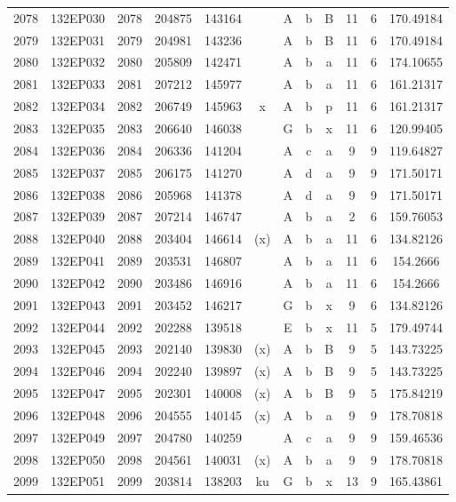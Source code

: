 \begin{tabular}{|*{12}{c|}}
2078 & 132EP030 & 2078 & 204875 & 143164 &  & A & b & B & 11 & 6 & 170.49184 \\ 
2079 & 132EP031 & 2079 & 204981 & 143236 &  & A & b & B & 11 & 6 & 170.49184 \\ 
2080 & 132EP032 & 2080 & 205809 & 142471 &  & A & b & a & 11 & 6 & 174.10655 \\ 
2081 & 132EP033 & 2081 & 207212 & 145977 &  & A & b & a & 11 & 6 & 161.21317 \\ 
2082 & 132EP034 & 2082 & 206749 & 145963 & x & A & b & p & 11 & 6 & 161.21317 \\ 
2083 & 132EP035 & 2083 & 206640 & 146038 &  & G & b & x & 11 & 6 & 120.99405 \\ 
2084 & 132EP036 & 2084 & 206336 & 141204 &  & A & c & a & 9 & 9 & 119.64827 \\ 
2085 & 132EP037 & 2085 & 206175 & 141270 &  & A & d & a & 9 & 9 & 171.50171 \\ 
2086 & 132EP038 & 2086 & 205968 & 141378 &  & A & d & a & 9 & 9 & 171.50171 \\ 
2087 & 132EP039 & 2087 & 207214 & 146747 &  & A & b & a & 2 & 6 & 159.76053 \\ 
2088 & 132EP040 & 2088 & 203404 & 146614 & (x) & A & b & a & 11 & 6 & 134.82126 \\ 
2089 & 132EP041 & 2089 & 203531 & 146807 &  & A & b & a & 11 & 6 & 154.2666 \\ 
2090 & 132EP042 & 2090 & 203486 & 146916 &  & A & b & a & 11 & 6 & 154.2666 \\ 
2091 & 132EP043 & 2091 & 203452 & 146217 &  & G & b & x & 9 & 6 & 134.82126 \\ 
2092 & 132EP044 & 2092 & 202288 & 139518 &  & E & b & x & 11 & 5 & 179.49744 \\ 
2093 & 132EP045 & 2093 & 202140 & 139830 & (x) & A & b & B & 9 & 5 & 143.73225 \\ 
2094 & 132EP046 & 2094 & 202240 & 139897 & (x) & A & b & B & 9 & 5 & 143.73225 \\ 
2095 & 132EP047 & 2095 & 202301 & 140008 & (x) & A & b & B & 9 & 5 & 175.84219 \\ 
2096 & 132EP048 & 2096 & 204555 & 140145 & (x) & A & b & a & 9 & 9 & 178.70818 \\ 
2097 & 132EP049 & 2097 & 204780 & 140259 &  & A & c & a & 9 & 9 & 159.46536 \\ 
2098 & 132EP050 & 2098 & 204561 & 140031 & (x) & A & b & a & 9 & 9 & 178.70818 \\ 
2099 & 132EP051 & 2099 & 203814 & 138203 & ku & G & b & x & 13 & 9 & 165.43861 \\ 

\end{tabular}
